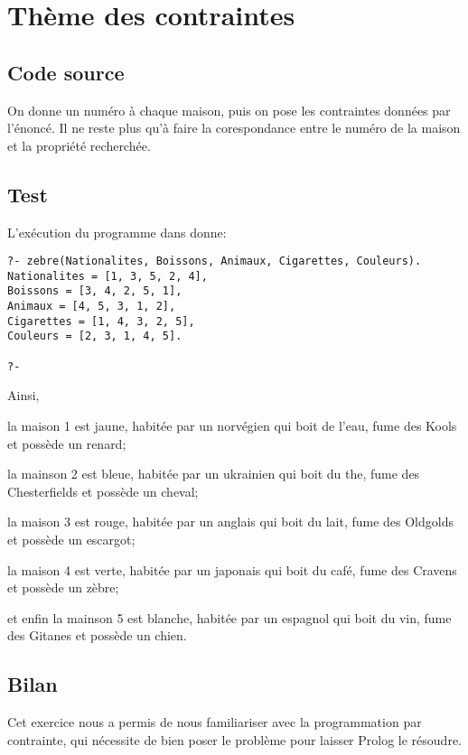 
\section{Thème des contraintes}

    \subsection{Code source}

        

            On donne un numéro à chaque maison, puis on pose les 
contraintes données par l'énoncé. Il ne reste plus qu'à faire la 
corespondance entre le numéro de la maison et la propriété recherchée.    

    \subsection{Test}

L'exécution du programme dans {} donne:

\begin{verbatim}
?- zebre(Nationalites, Boissons, Animaux, Cigarettes, Couleurs).
Nationalites = [1, 3, 5, 2, 4],
Boissons = [3, 4, 2, 5, 1],
Animaux = [4, 5, 3, 1, 2],
Cigarettes = [1, 4, 3, 2, 5],
Couleurs = [2, 3, 1, 4, 5].

?-
\end{verbatim}

   Ainsi, 
\begin{description}
    \item la maison 1 est jaune, habitée par un norvégien qui boit de 
l'eau, fume des Kools et possède un renard;

    \item la mainson 2 est bleue, habitée par un ukrainien qui boit du 
the, fume des Chesterfields et possède un cheval;

    \item la maison 3 est rouge, habitée par un anglais  qui boit du 
lait, fume des Oldgolds et possède un escargot;

    \item la maison 4 est verte, habitée par un japonais qui boit du 
café, fume des Cravens et possède un zèbre;

    \item et enfin la mainson 5 est blanche, habitée par un espagnol qui
boit du vin, fume des Gitanes et possède un chien.
\end{description}

    \subsection{Bilan}

        Cet exercice nous a permis de nous familiariser avec la 
programmation par contrainte, qui nécessite de bien poser le problème
pour laisser Prolog le résoudre.

